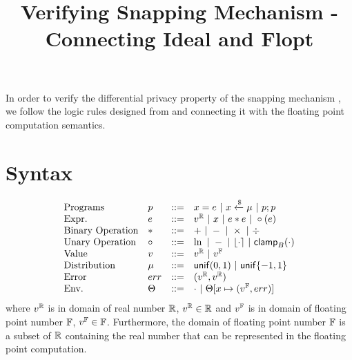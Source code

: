 \documentclass[a4paper,11pt]{article}
\begin{document}
\title{Verifying Snapping Mechanism - Connecting Ideal and Flopt}
\author{}

\date{}

\maketitle
In order to verify the differential privacy property of
the snapping mechanism \cite{mironov2012significance},
we follow the logic rules designed from
\cite{barthe2016proving} and connecting 
it with the floating point computation semantics.
\section{Syntax}
\[\begin{array}{llll}
\mbox{Programs} & \prog & ::= & 
     \varx = \expr ~|~ \varx \samplel \edistr
	~|~ \prog ; \prog \\

\mbox{Expr.} & \expr & ::= & \rval 
	~|~ \varx  ~|~ \expr \bop \expr
	~|~ \uop (\expr) \\
%
\mbox{Binary Operation} & \bop & ::= & + ~|~ - ~|~ \times ~|~ \div \\
%
\mbox{Unary Operation} & \uop & ::= & \ln ~|~ - ~|~ \round{\cdot} 
	~|~ \clamp_B(\cdot) \\
%
\mbox{Value} & \valv & ::= & \rval ~|~  \fval \\
%
\mbox{Distribution} & \edistr & ::= & \uniform(0, 1) 
%
	~|~ \uniform\{-1, 1\}\\ 
%
\mbox{Error} & \err & ::= & (\rval, \rval) \\
%
\mbox{Env.} & \trsenv & ::= & \cdot ~|~ \trsenv[x \mapsto (\fval, \err)] 
\end{array}
\]
where $v^{\mathbb{R}}$ is in domain of real number $\mathbb{R}$, $v^{\mathbb{R}} \in \mathbb{R}$ and $v^{\mathbb{F}}$ is in domain of floating point number $\mathbb{F}$, $v^{\mathbb{F}} \in \mathbb{F}$. Furthermore, the domain of floating point number $\mathbb{F}$ is a subset of $\mathbb{R}$ containing the real number that can be represented in the floating point computation.
\end{document}

